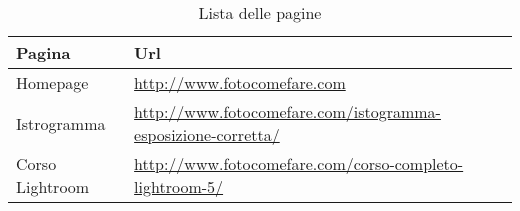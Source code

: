 \begin{table}[ht]
\begin{center}
\begin{tabular}{|l|p{8cm}|}
\hline 
\textbf{Pagina} & \textbf{Url}\\ \hline 
Homepage & \url{http://www.fotocomefare.com}  \\ \hline
Istrogramma & \url{http://www.fotocomefare.com/istogramma-esposizione-corretta/} \\ \hline
Corso Lightroom & \url{http://www.fotocomefare.com/corso-completo-lightroom-5/} \\ \hline

\end{tabular}
\caption{Lista delle pagine}\label{tabella:listaFigure}
\end{center}
\end{table}


